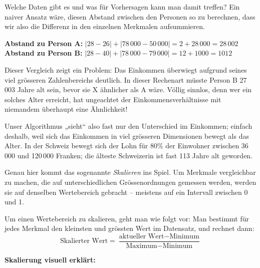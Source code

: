 \begin{lpu}{Welche Daten gibt es und was für Vorhersagen kann man damit treffen?}
Ein naiver Ansatz wäre, diesen Abstand zwischen den Personen so zu berechnen, dass wir also die Differenz in den einzelnen Merkmalen aufsummieren.

\textbf{Abstand zu Person A:} $|28 - 26| + |78\,000 - 50\,000| = 2 + 28\,000 = 28\,002$ \\
\textbf{Abstand zu Person B:} $|28 - 40| + |78\,000 - 79\,000| = 12 + 1000 = 1012$

Dieser Vergleich zeigt ein Problem: Das Einkommen überwiegt aufgrund seines viel grösseren Zahlenbereichs deutlich. In dieser Rechenart müsste Person B 27\,003 Jahre alt sein, bevor sie X ähnlicher als A wäre. Völlig sinnlos, denn wer ein solches Alter erreicht, hat ungeachtet der Einkommensverhältnisse mit niemandem überhaupt eine Ähnlichkeit!

Unser Algorithmus „sieht“ also fast nur den Unterschied im Einkommen; einfach deshalb, weil sich das Einkommen in viel grösseren Dimensionen bewegt als das Alter. In der Schweiz bewegt sich der Lohn für 80\% der Einwohner zwischen 36\,000 und 120\,000 Franken; die älteste Schweizerin ist fast 113 Jahre alt geworden.

Genau hier kommt das sogenannte \emph{Skalieren} ins Spiel. Um  Merkmale vergleichbar zu machen, die auf unterschiedlichen Grössenordnungen gemessen werden, werden sie auf denselben Wertebereich gebracht – meistens auf ein Intervall zwischen 0 und 1. 

\begin{theorie}
    Um einen Wertebereich zu skalieren, geht man wie folgt vor: Man bestimmt für jedes Merkmal den kleinsten und grössten Wert im Datensatz, und rechnet dann:
    \[
\text{Skalierter Wert} = \frac{\text{aktueller Wert} - \text{Minimum}}{\text{Maximum} - \text{Minimum}}
\]
\end{theorie}

\textbf{Skalierung visuell erklärt:}

\begin{center}
\end{center}




\end{lpu}
